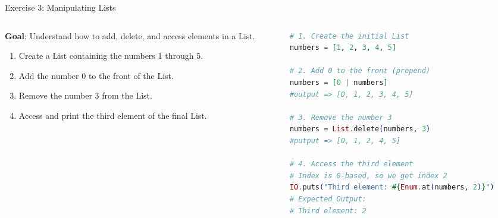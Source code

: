 \documentclass[aspectratio=169, table]{beamer}
\begin{document}
\begin{frame}[fragile]{Exercise 3: Manipulating Lists}
\vspace{20pt}
\begin{columns}
    \begin{column}[T]{0.34\textwidth}
        \textbf{Goal}: Understand how to add, delete, and access elements in a List.
        \begin{enumerate}
            \item Create a List containing the numbers 1 through 5.
            \item Add the number 0 to the front of the List.
            \item Remove the number 3 from the List.
            \item Access and print the third element of the final List.
        \end{enumerate}

    \end{column}

    \begin{column}[T]{0.66\textwidth}
        \begin{lstlisting}[language=Elixir, basicstyle=\ttfamily\footnotesize]
# 1. Create the initial List
numbers = [1, 2, 3, 4, 5]

# 2. Add 0 to the front (prepend)
numbers = [0 | numbers]
#output => [0, 1, 2, 3, 4, 5]

# 3. Remove the number 3
numbers = List.delete(numbers, 3)
#putput => [0, 1, 2, 4, 5]

# 4. Access the third element
# Index is 0-based, so we get index 2
IO.puts("Third element: #{Enum.at(numbers, 2)}")
# Expected Output:
# Third element: 2
        \end{lstlisting}
    \end{column}
\end{columns}
\end{frame}
\end{document}

